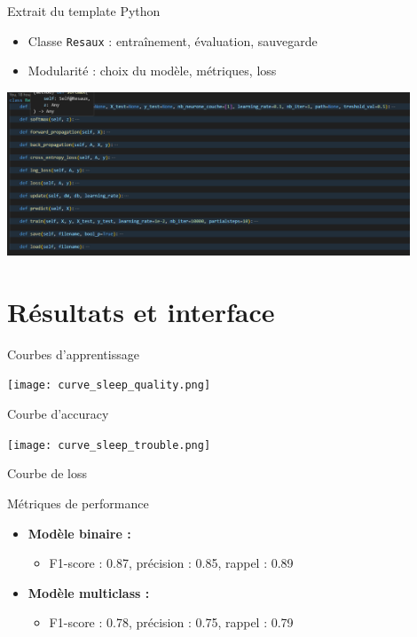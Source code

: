 \documentclass{beamer}
\begin{document}
\begin{frame}{Extrait du template Python}
  \begin{itemize}
    \item Classe \texttt{Resaux} : entraînement, évaluation, sauvegarde
    \item Modularité : choix du modèle, métriques, loss
  \end{itemize}
  \begin{center}
    \includegraphics[width=0.9\textwidth]{screen_class.png}
  \end{center}
\end{frame}

\section{Résultats et interface}

\begin{frame}{Courbes d'apprentissage}
    \begin{center}

      \begin{minipage}{0.7\linewidth}
        \centering
        \texttt{[image: curve\_sleep\_quality.png]}
        
        {\tiny Courbe d'accuracy}
      \end{minipage}

      \begin{minipage}{0.7\linewidth}
        \centering
        \texttt{[image: curve\_sleep\_trouble.png]}
        
        {\tiny Courbe de loss}
      \end{minipage}
    \end{center}
\end{frame}

\begin{frame}{Métriques de performance}
  \begin{itemize}
    \item \textbf{Modèle binaire :}
    \begin{itemize}
      \item F1-score : 0.87, précision : 0.85, rappel : 0.89
    \end{itemize}
    \item \textbf{Modèle multiclass :}
    \begin{itemize}
      \item F1-score : 0.78, précision : 0.75, rappel : 0.79
    \end{itemize}
  \end{itemize}
\end{frame}
\end{document}
